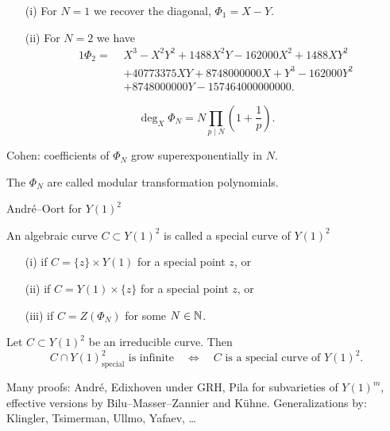\documentclass{beamer}
\begin{document}
\begin{frame}
  \begin{example}
    \begin{enumerate}
    \item [(i)]    For $N=1$ we recover the diagonal, 
      $\Phi_1 = X-Y$.
    \item[(ii)] For $N=2$ we have   
      \begin{alignat*}1
        \Phi_2 = 
        \,\,&X^3 - X^2Y^2 + 1488X^2Y - 162000X^2 + 1488XY^2 \\
        &+ 40773375XY +
        8748000000X +Y^3 - 162000Y^2 \\
        &+ 8748000000Y -157464000000000.    
      \end{alignat*}
    \end{enumerate}
  \end{example}
  \vspace{-0.5cm}
  \begin{equation*}
    \deg_X \Phi_N = N\prod_{p\mid N}\left(1+\frac 1p\right). 
  \end{equation*}
 
  Cohen: coefficients of $\Phi_N$ grow superexponentially in $N$.
  
  \begin{definition}
    The $\Phi_N$ are called \alert{modular transformation polynomials}.
  \end{definition}
\end{frame}

\begin{frame}{Andr\'e--Oort for $Y(1)^2$}
  \begin{definition}
    An algebraic curve  $C\subset Y(1)^2$ is called a \alert{special curve} of
    $Y(1)^2$ 
    \begin{enumerate}
    \item [(i)] if $C = \{z\}\times Y(1)$ for a special point $z$, or
    \item [(ii)] if $C =  Y(1)\times \{z\}$ for a special point $z$, or
    \item[(iii)] if $C=Z(\Phi_N)$ for some $N\in{\mathbb{N}}$. 
    \end{enumerate}
  \end{definition}

  \begin{theorem}
    Let $C\subset Y(1)^2$ be an irreducible curve. Then
    \begin{equation*}
      C \cap Y(1)^2_{\mathrm{special}}\text{ is
        infinite}\quad\Longleftrightarrow\quad \text{$C$ is a special
        curve of $Y(1)^2$}. 
    \end{equation*}  
  \end{theorem}

  \vspace{-0.25cm}
  Many proofs: Andr\'e, Edixhoven under GRH, Pila for subvarieties of
  $Y(1)^m$, effective versions by Bilu--Masser--Zannier and K\"uhne.
  Generalizations by: Klingler, Tsimerman, Ullmo, Yafaev, \ldots
\end{frame}
\end{document}
